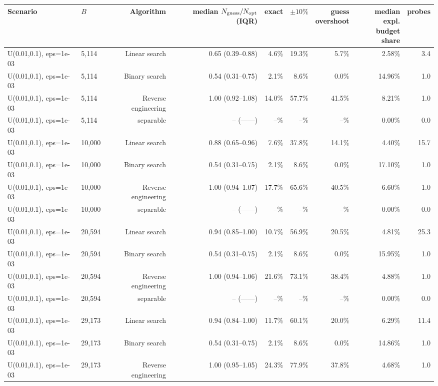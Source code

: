 \begin{tabular}{llrrrrrrr}
\toprule
Scenario & $B$ & Algorithm & \makecell{median\\$N_{\rm guess}/N_{\rm opt}$ (IQR)} & exact & $\pm10\%$ & \makecell{guess\\overshoot} & \makecell{median expl.\\budget share} & probes \\
\midrule
U(0.01,0.1), eps=1e-03 & 5,114 & Linear search & 0.65 (0.39--0.88) & 4.6\% & 19.3\% & 5.7\% & 2.58\% & 3.4 \\
U(0.01,0.1), eps=1e-03 & 5,114 & Binary search & 0.54 (0.31--0.75) & 2.1\% & 8.6\% & 0.0\% & 14.96\% & 1.0 \\
U(0.01,0.1), eps=1e-03 & 5,114 & Reverse engineering & 1.00 (0.92--1.08) & 14.0\% & 57.7\% & 41.5\% & 8.21\% & 1.0 \\
U(0.01,0.1), eps=1e-03 & 5,114 & separable & -- (------) & --\% & --\% & --\% & 0.00\% & 0.0 \\
U(0.01,0.1), eps=1e-03 & 10,000 & Linear search & 0.88 (0.65--0.96) & 7.6\% & 37.8\% & 14.1\% & 4.40\% & 15.7 \\
U(0.01,0.1), eps=1e-03 & 10,000 & Binary search & 0.54 (0.31--0.75) & 2.1\% & 8.6\% & 0.0\% & 17.10\% & 1.0 \\
U(0.01,0.1), eps=1e-03 & 10,000 & Reverse engineering & 1.00 (0.94--1.07) & 17.7\% & 65.6\% & 40.5\% & 6.60\% & 1.0 \\
U(0.01,0.1), eps=1e-03 & 10,000 & separable & -- (------) & --\% & --\% & --\% & 0.00\% & 0.0 \\
U(0.01,0.1), eps=1e-03 & 20,594 & Linear search & 0.94 (0.85--1.00) & 10.7\% & 56.9\% & 20.5\% & 4.81\% & 25.3 \\
U(0.01,0.1), eps=1e-03 & 20,594 & Binary search & 0.54 (0.31--0.75) & 2.1\% & 8.6\% & 0.0\% & 15.95\% & 1.0 \\
U(0.01,0.1), eps=1e-03 & 20,594 & Reverse engineering & 1.00 (0.94--1.06) & 21.6\% & 73.1\% & 38.4\% & 4.88\% & 1.0 \\
U(0.01,0.1), eps=1e-03 & 20,594 & separable & -- (------) & --\% & --\% & --\% & 0.00\% & 0.0 \\
U(0.01,0.1), eps=1e-03 & 29,173 & Linear search & 0.94 (0.84--1.00) & 11.7\% & 60.1\% & 20.0\% & 6.29\% & 11.4 \\
U(0.01,0.1), eps=1e-03 & 29,173 & Binary search & 0.54 (0.31--0.75) & 2.1\% & 8.6\% & 0.0\% & 14.86\% & 1.0 \\
U(0.01,0.1), eps=1e-03 & 29,173 & Reverse engineering & 1.00 (0.95--1.05) & 24.3\% & 77.9\% & 37.8\% & 4.68\% & 1.0 \\

\end{tabular}
